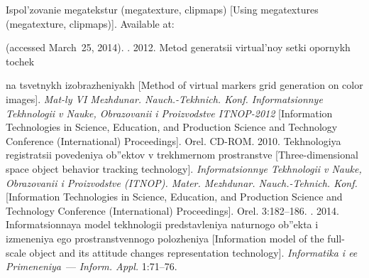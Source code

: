   \begin{multicols}{2}

\renewcommand{\bibname}{\protect\rmfamily References}

{\small\frenchspacing
 {%
 \begin{thebibliography}{9}


Ispol'zovanie megatekstur (megatexture, clipmaps) [Using megatextures
(megatexture, clipmaps)]. Available at:\linebreak\vspace*{-12pt}

\columnbreak


 (accessed March~25,
2014).
. 2012. Metod
generatsii virtual'noy setki opornykh tochek \linebreak\vspace*{-12pt}

\pagebreak

\noindent
na tsvetnykh izobrazheniyakh
[Method of virtual markers grid generation on color images]. \textit{Mat-ly VI
Mezhdunar. Nauch.-Tekhnich. Konf. Informatsionnye Tekhnologii v Nauke,
Obrazovanii i Proizvodstve ITNOP-2012} [Information Technologies in
Science, Education, and Production Science and Technology Conference
(International) Proceedings]. Orel. CD-ROM.
 2010. Tekhnologiya registratsii povedeniya ob''ektov v
trekhmernom prostranstve [Three-dimensional space object behavior tracking technology].
\textit{Informatsionnye Tekhnologii v Nauke, Obrazovanii i Proizvodstve
(ITNOP). Mater. Mezhdunar. Nauch.-Tehnich. Konf.} [Information
Technologies in Science, Education, and Production Science and Technology
Conference (International) Proceedings]. Orel. 3:182--186.
. 2014.
Informatsionnaya model tekhnologii predstavleniya naturnogo ob''ekta i
izmeneniya ego prostranstvennogo polozheniya [Information model of the
full-scale object and its attitude changes representation technology].
\textit{Informatika i ee Primeneniya}~--- \textit{Inform. Appl.} 1:71--76.

\end{thebibliography}

 }
 }

\end{multicols}

